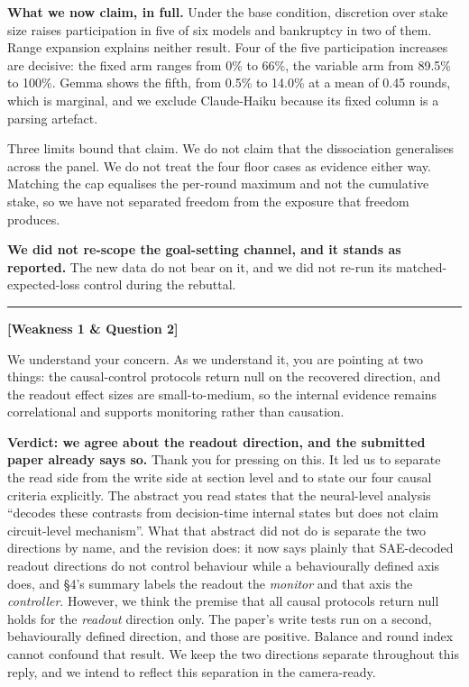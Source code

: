 \textbf{What we now claim, in full.} Under the base condition, discretion over stake size raises
participation in five of six models and bankruptcy in two of them. Range expansion explains neither
result. Four of the five participation increases are decisive: the fixed arm ranges from 0\% to
66\%, the variable arm from 89.5\% to 100\%. Gemma shows the fifth, from 0.5\% to 14.0\% at a mean
of 0.45 rounds, which is marginal, and we exclude Claude-Haiku because its fixed column is a parsing
artefact.

Three limits bound that claim. We do not claim that the dissociation generalises across the panel.
We do not treat the four floor cases as evidence either way. Matching the cap equalises the
per-round maximum and not the cumulative stake, so we have not separated freedom from the exposure
that freedom produces.

\textbf{We did not re-scope the goal-setting channel, and it stands as reported.} The new data do
not bear on it, and we did not re-run its matched-expected-loss control during the rebuttal.


\vspace{1em}
\hrule
\vspace{1em}

\textbf{[Weakness 1 \& Question 2]}

We understand your concern. As we understand it, you are pointing at two things: the causal-control
protocols return null on the recovered direction, and the readout effect sizes are small-to-medium,
so the internal evidence remains correlational and supports monitoring rather than causation.

\textbf{Verdict: we agree about the readout direction, and the submitted paper already says so.}
Thank you for pressing on this. It led us to separate the read side from the write side at
section level and to state our four causal criteria explicitly.
The abstract you read states that the neural-level analysis ``decodes these contrasts from
decision-time internal states but does not claim circuit-level mechanism''. What that abstract did
not do is separate the two directions by name, and the revision does: it now says plainly that
SAE-decoded readout directions do not control behaviour while a behaviourally defined axis does,
and \S4's summary labels the readout the \emph{monitor} and that axis the \emph{controller}.
However, we think the premise that all causal protocols return null holds for the \emph{readout}
direction only. The paper's write tests run on a second, behaviourally defined direction, and those
are positive. Balance and round index cannot confound that result. We keep the two directions
separate throughout this reply, and we intend to reflect this separation in the camera-ready.

